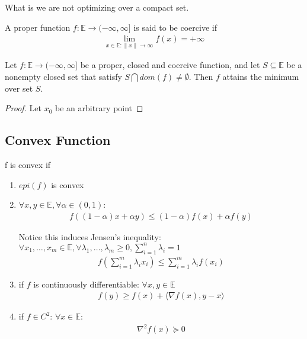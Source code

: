 \documentclass[11pt]{article}
\begin{document}
What is we are not optimizing over a compact set.
\begin{definition}
    A proper function $f: \mathbb{E} \to (-\infty,\infty]$ is said to be coercive if 
    \begin{align*}
        \lim_{x \in \mathbb{E}:\| x \|  \to \infty} f(x) = +\infty
    \end{align*}
\end{definition}

\begin{theorem}
    Let $f:\mathbb{E} \to (-\infty,\infty]$ be a proper, closed and coercive function, and let $S
    \subseteq \mathbb{E}$ be a nonempty closed set that satisfy $S \bigcap dom(f) \neq \emptyset$.
    Then $f$ attains the minimum over set $S$.
\end{theorem}
\begin{proof}
    Let $x_0$ be an arbitrary point
\end{proof}

\subsection{Convex Function}
\begin{definition}
    f is convex if 
    \begin{enumerate}
        \item $epi(f)$ is convex
        \item $\forall x,y \in \mathbb{E}, \forall \alpha \in (0,1)$:
        \begin{align*}
            f((1-\alpha)x + \alpha y ) \le (1-\alpha)f(x) + \alpha f(y)
        \end{align*}
        \begin{remark}
            Notice this induces Jensen's inequality: $\forall x_1, \ldots ,x_m \in \mathbb{E},
            \forall \lambda_1, \ldots ,\lambda_m \ge 0, \sum_{i=1}^{n}\lambda_i = 1$
            \begin{align*}
                f(\sum_{i=1}^{m}\lambda_i x_i) \le \sum_{i=1}^{m} \lambda_i f(x_i)
            \end{align*}
        \end{remark}
        \item if $f$ is continuously differentiable: $\forall x,y \in \mathbb{E}$
        \begin{align*}
            f(y) \ge f(x) + \langle \nabla f(x),y-x \rangle
        \end{align*}
        \item if $f \in C^{2}$: $\forall x \in \mathbb{E}$:
        \begin{align*}
            \nabla^{2}f(x) \succcurlyeq 0
        \end{align*}
    \end{enumerate}
\end{definition}
\end{document}
